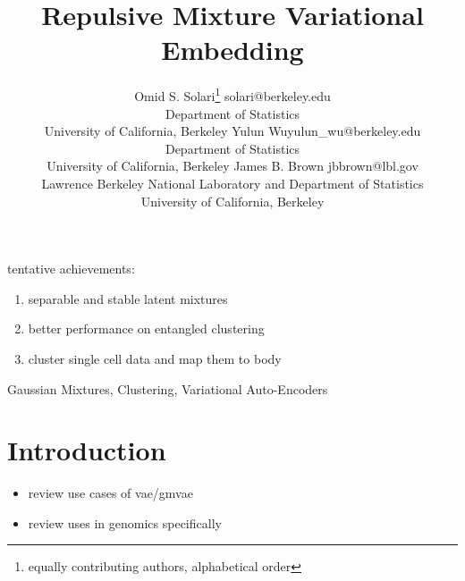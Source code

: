 \documentclass[twoside,11pt]{article}
\begin{document}
\title{Repulsive Mixture Variational Embedding}

\author{\name Omid S. Solari\thanks{equally contributing authors, alphabetical order} \email solari@berkeley.edu \\
       \addr Department of Statistics\\
       University of California, Berkeley
       \AND
       \name Yulun Wu\footnotemark[1] \email yulun\_wu@berkeley.edu\\
       \addr Department of Statistics\\
       University of California, Berkeley
       \AND
       \name James B. Brown \email jbbrown@lbl.gov\\
       \addr Lawrence Berkeley National Laboratory and Department of Statistics\\
       University of California, Berkeley}

\editor{}

\maketitle

\begin{abstract}%


\end{abstract}

tentative achievements:
\begin{enumerate}
    \item separable and stable latent mixtures
    \item better performance on entangled clustering
    \item cluster single cell data and map them to body
\end{enumerate}


\begin{keywords}
Gaussian Mixtures, Clustering, Variational Auto-Encoders
\end{keywords}

\section{Introduction}

\begin{itemize}
    \item review use cases of vae/gmvae
    \item review uses in genomics specifically
\end{itemize}
\end{document}

